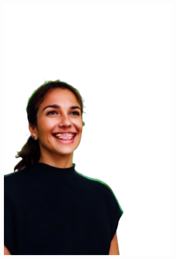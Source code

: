 \begin{figure}[ht]
\begin{subfigure}{0.08\linewidth}
        \includegraphics[width=\textwidth]{Figures/results/high/irene_smile/11_render.png}

\end{subfigure}
\end{figure}
